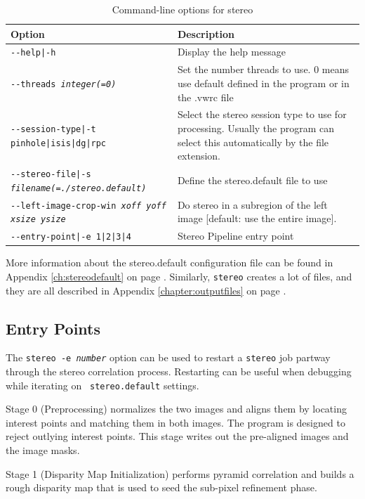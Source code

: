 \begin{longtable}{|l|p{7.5cm}|}
\caption{Command-line options for stereo}
\label{tbl:stereo}
\endfirsthead
\endhead
\endfoot
\endlastfoot
\hline
Option & Description \\ \hline \hline
\texttt{-\/-help|-h} & Display the help message\\ \hline
\texttt{-\/-threads \textit{integer(=0)}} & Set the number threads to use. 0 means use default defined in the program or in the .vwrc file\\ \hline
\texttt{-\/-session-type|-t pinhole|isis|dg|rpc} & Select the stereo session type to use for processing. Usually the program can select this automatically by the file extension.\\ \hline
\texttt{-\/-stereo-file|-s \textit{filename(=./stereo.default)}} & Define the stereo.default file to use\\ \hline
\texttt{-\/-left-image-crop-win \textit{xoff yoff xsize ysize}}  & Do stereo in a subregion of the left image [default: use the entire image].\\ \hline
\texttt{-\/-entry-point|-e 1|2|3|4} & Stereo Pipeline entry point \\ \hline
\end{longtable}

More information about the stereo.default configuration file can be
found in Appendix \ref{ch:stereodefault} on page
\pageref{ch:stereodefault}.  Similarly, \texttt{stereo} creates a lot
of files, and they are all described in Appendix
\ref{chapter:outputfiles} on page \pageref{chapter:outputfiles}.

\subsection{Entry Points}
\label{entrypoints}

The \texttt{stereo -e \textit{number}} option can be used to restart
a {\tt stereo} job partway through the stereo correlation process.
Restarting can be useful when debugging while iterating on {\tt
stereo.default} settings.

Stage 0 (Preprocessing) normalizes the two images and aligns them
by locating interest points and matching them in both images. The
program is designed to reject outlying interest points.  This stage
writes out the pre-aligned images and the image masks.

Stage 1 (Disparity Map Initialization) performs pyramid correlation and builds a rough disparity map that is used to seed the sub-pixel refinement phase.

